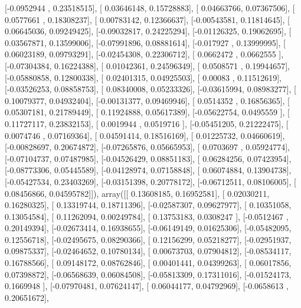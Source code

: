 \documentclass{article}
\begin{document}
       [-0.0952944 ,  0.23518515],
       [ 0.03646148,  0.15728883],
       [ 0.04663766,  0.07367506],
       [ 0.0577661 ,  0.18308237],
       [ 0.00783142,  0.12366637],
       [-0.00543581,  0.11814645],
       [ 0.06645036,  0.09249425],
       [-0.09032817,  0.24225294],
       [-0.01126325,  0.19062695],
       [ 0.03567871,  0.13599006],
       [-0.07991896,  0.08881614],
       [-0.017927  ,  0.13999995],
       [ 0.06023189,  0.09793291],
       [-0.02454308,  0.22306712],
       [ 0.0662472 ,  0.0662555 ],
       [-0.07304384,  0.16224388],
       [ 0.01042361,  0.24596349],
       [ 0.0508571 ,  0.19944657],
       [-0.05880858,  0.12800338],
       [ 0.02401315,  0.04925503],
       [ 0.00083   ,  0.11512619],
       [-0.03526253,  0.08858753],
       [ 0.08340008,  0.05233326],
       [-0.03615994,  0.08983277],
       [ 0.10079377,  0.04932404],
       [-0.00131377,  0.09469946],
       [ 0.0514352 ,  0.16856365],
       [ 0.05307181,  0.21789449],
       [ 0.11924888,  0.05617389],
       [-0.05622754,  0.0495559 ],
       [ 0.11727117,  0.23832153],
       [ 0.0019944 ,  0.0519716 ],
       [-0.05451205,  0.21222475],
       [ 0.0074746 ,  0.07169364],
       [ 0.04591414,  0.18516169],
       [ 0.01225732,  0.04660619],
       [-0.00828697,  0.20674872],
       [-0.07265876,  0.05665953],
       [ 0.0703697 ,  0.05924774],
       [-0.07104737,  0.07487985],
       [-0.04526429,  0.08851183],
       [ 0.06284256,  0.07423954],
       [-0.08773306,  0.05445589],
       [-0.04128974,  0.07158848],
       [ 0.06074884,  0.13904738],
       [-0.05427534,  0.23403269],
       [-0.03151398,  0.20778172],
       [-0.06712511,  0.08106005],
       [ 0.08456866,  0.04595782]]), array([[ 0.13608185,  0.16952581],
       [ 0.02030211,  0.16280325],
       [ 0.13319744,  0.18711396],
       [-0.02587307,  0.09627977],
       [ 0.10351058,  0.13054584],
       [ 0.11262094,  0.00249784],
       [ 0.13753183,  0.0308247 ],
       [-0.0512467 ,  0.20149394],
       [-0.02673414,  0.16938655],
       [-0.06149149,  0.01625306],
       [-0.05482095,  0.12556718],
       [-0.02495675,  0.08290366],
       [ 0.12156299,  0.05218277],
       [-0.02951937,  0.09875337],
       [-0.02464652,  0.10780134],
       [ 0.00673703,  0.07904812],
       [-0.08534117,  0.16788566],
       [ 0.09148172,  0.08762846],
       [ 0.00401441,  0.04399263],
       [ 0.06017856,  0.07398872],
       [-0.06568639,  0.06084508],
       [-0.05813309,  0.17311016],
       [-0.01524173,  0.1669948 ],
       [-0.07970481,  0.07624147],
       [ 0.06044177,  0.04792969],
       [-0.0658613 ,  0.20651672],
\end{document}
